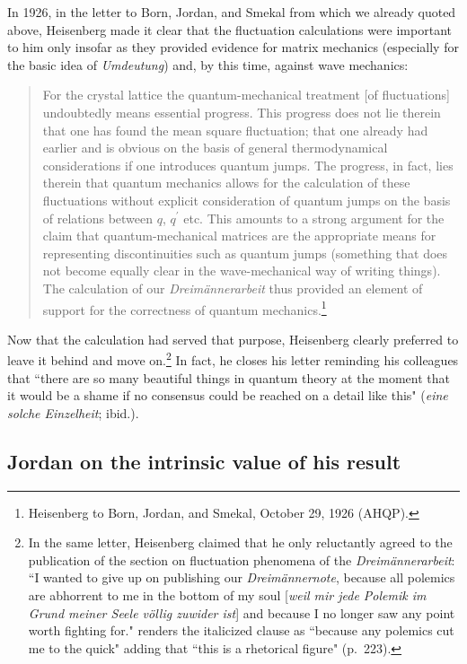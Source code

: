 \documentclass[12pt]{elsart}
\begin{document}
In 1926, in the letter to Born, Jordan, and Smekal from which we already quoted above, Heisenberg made it clear that the fluctuation calculations were important to him only insofar as they provided evidence for matrix mechanics (especially for the basic idea of {\it Umdeutung}) and, by this time, against wave mechanics:
\begin{quotation}
For the crystal lattice the quantum-mechanical treatment [of fluctuations] undoubtedly means essential progress. This progress does not lie therein that one has found the mean square fluctuation; that one already had earlier and is obvious on the basis of general thermodynamical considerations if one introduces quantum jumps. The progress, in fact, lies therein that quantum mechanics allows for the calculation of these fluctuations without explicit consideration of quantum jumps on the basis of relations between $q$, $q^\prime$ etc. This amounts to a strong argument for the claim that quantum-mechanical matrices are the appropriate means for representing discontinuities such as quantum jumps (something that does not become equally clear in the wave-mechanical way of writing things). The calculation of our {\it Dreim\"annerarbeit} thus provided an element of support for the correctness of quantum mechanics.\footnote{Heisenberg to Born, Jordan, and Smekal, October 29, 1926 (AHQP).}
\end{quotation} 
Now that the calculation had served that purpose, Heisenberg clearly preferred to leave it behind and move on.\footnote{In the same letter, Heisenberg claimed that he only reluctantly agreed to the publication of the section on fluctuation phenomena of the {\it Dreim\"annerarbeit}:
``I wanted to give up on publishing our  {\it Dreim\"annernote}, because all polemics are abhorrent to me in the bottom of my soul [{\it weil mir jede Polemik im Grund meiner Seele v\"ollig zuwider ist}] and because I no longer saw any point worth fighting for." \citet{Darrigol 1986} renders the  italicized clause as ``because any polemics cut me to the quick" adding that  ``this is a rhetorical figure" (p.\ 223).} In fact, he closes his letter reminding his colleagues that ``there are so many beautiful things in quantum theory at the moment that it would be a shame if no consensus could be reached on a detail like this" ({\it eine solche Einzelheit}; ibid.). 

\subsection{Jordan on the intrinsic value of his result}
\end{document}
